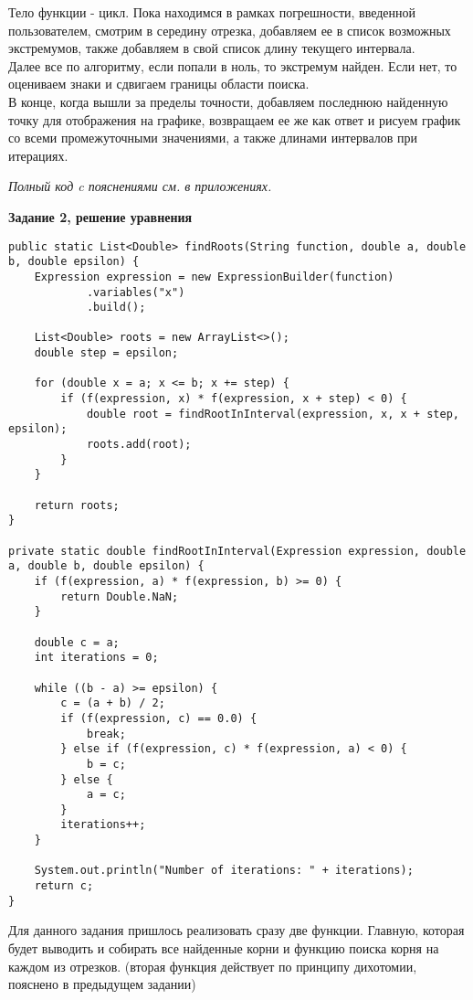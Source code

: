 Тело функции - цикл. Пока находимся в рамках погрешности, введенной пользователем,
смотрим в середину отрезка, добавляем ее в список возможных экстремумов, также добавляем 
в свой список длину текущего интервала.\\
Далее все по алгоритму, если попали в ноль, то экстремум найден. Если нет, то оцениваем знаки
и сдвигаем границы области поиска.\\
В конце, когда вышли за пределы точности, добавляем последнюю найденную точку для отображения на графике,
возвращаем ее же как ответ и рисуем график со всеми промежуточными значениями, а также длинами интервалов при 
итерациях.
\begin{center}
    \textit{Полный код c пояснениями см. в приложениях.}
\end{center}
\vspace{1cm}

\textbf{Задание 2, решение уравнения}\\

\begin{lstlisting}[style=JavaStyle, caption={Java Code for Finding Multiple Roots}]
public static List<Double> findRoots(String function, double a, double b, double epsilon) {
    Expression expression = new ExpressionBuilder(function)
            .variables("x")
            .build();

    List<Double> roots = new ArrayList<>();
    double step = epsilon;

    for (double x = a; x <= b; x += step) {
        if (f(expression, x) * f(expression, x + step) < 0) {
            double root = findRootInInterval(expression, x, x + step, epsilon);
            roots.add(root);
        }
    }

    return roots;
}

private static double findRootInInterval(Expression expression, double a, double b, double epsilon) {
    if (f(expression, a) * f(expression, b) >= 0) {
        return Double.NaN;
    }

    double c = a;
    int iterations = 0;

    while ((b - a) >= epsilon) {
        c = (a + b) / 2;
        if (f(expression, c) == 0.0) {
            break;
        } else if (f(expression, c) * f(expression, a) < 0) {
            b = c;
        } else {
            a = c;
        }
        iterations++;
    }

    System.out.println("Number of iterations: " + iterations);
    return c;
}
    \end{lstlisting}
Для данного задания пришлось реализовать сразу две функции. Главную, которая будет выводить и
собирать все найденные корни и функцию поиска корня на каждом из отрезков. (вторая функция действует
по принципу дихотомии, пояснено в предыдущем задании)\\

